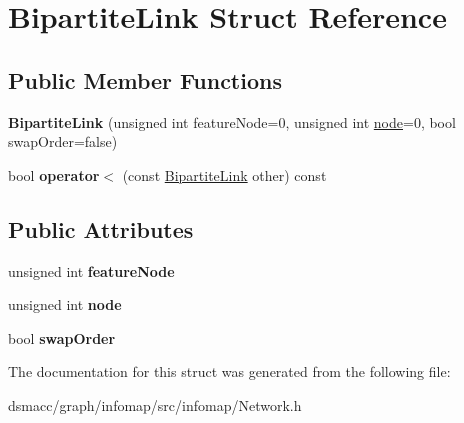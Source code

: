 \hypertarget{structBipartiteLink}{}\section{Bipartite\+Link Struct Reference}
\label{structBipartiteLink}
\subsection*{Public Member Functions}
\begin{DoxyCompactItemize}
\item 
\mbox{\label{structBipartiteLink_afe01743f66bfd7d4cf1a960edf9a13ff}} 
{\bfseries Bipartite\+Link} (unsigned int feature\+Node=0, unsigned int \mbox{\hyperlink{structnode}{node}}=0, bool swap\+Order=false)
\item 
\mbox{\label{structBipartiteLink_aa61242024592a796c5469883ad090ae8}} 
bool {\bfseries operator$<$} (const \mbox{\hyperlink{structBipartiteLink}{Bipartite\+Link}} other) const
\end{DoxyCompactItemize}
\subsection*{Public Attributes}
\begin{DoxyCompactItemize}
\item 
\mbox{\label{structBipartiteLink_a0f122b49d2e407d6e4c2f43a54df1bb4}} 
unsigned int {\bfseries feature\+Node}
\item 
\mbox{\label{structBipartiteLink_a21635d78abeca2082b0e50f45ad6da86}} 
unsigned int {\bfseries node}
\item 
\mbox{\label{structBipartiteLink_add230db5ff057119b072972c93635ed6}} 
bool {\bfseries swap\+Order}
\end{DoxyCompactItemize}


The documentation for this struct was generated from the following file\+:\begin{DoxyCompactItemize}
\item 
dsmacc/graph/infomap/src/infomap/Network.\+h\end{DoxyCompactItemize}

